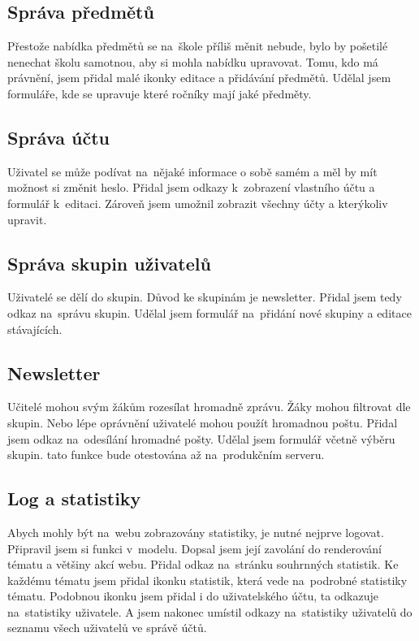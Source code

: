\documentclass[thesis=B,czech]{FITthesis}[2012/06/26]
\begin{document}
\subsection{Správa předmětů}

Přestože nabídka předmětů se na~škole příliš měnit nebude, bylo by pošetilé nenechat školu samotnou, aby si mohla nabídku upravovat. Tomu, kdo má právnění, jsem přidal malé ikonky editace a přidávání předmětů. Udělal jsem formuláře, kde se upravuje které ročníky mají jaké předměty.

\subsection{Správa účtu}

Uživatel se může podívat na~nějaké informace o sobě samém a měl by mít možnost si změnit heslo. Přidal jsem odkazy k~zobrazení vlastního účtu a formulář k~editaci. Zároveň jsem umožnil zobrazit všechny účty a kterýkoliv upravit.

\subsection{Správa skupin uživatelů}

Uživatelé se dělí do skupin. Důvod ke skupinám je newsletter. Přidal jsem tedy  odkaz na~správu skupin. Udělal jsem formulář na~přidání nové skupiny a editace stávajících.

\subsection{Newsletter}

Učitelé mohou svým žákům rozesílat hromadně zprávu. Žáky mohou filtrovat dle skupin. Nebo lépe oprávnění uživatelé mohou použít hromadnou poštu. Přidal jsem odkaz na~odesílání hromadné pošty. Udělal jsem formulář včetně výběru skupin. tato funkce bude otestována až na~produkčním serveru.

\subsection{Log a statistiky}

Abych mohly být na~webu zobrazovány statistiky, je nutné nejprve logovat. Připravil jsem si funkci v~modelu. Dopsal jsem její zavolání do renderování tématu a většiny akcí webu. Přidal odkaz na~stránku souhrnných statistik. Ke každému tématu jsem přidal ikonku statistik, která vede na~podrobné statistiky tématu. Podobnou ikonku jsem přidal i do uživatelského účtu, ta odkazuje na~statistiky uživatele. A jsem nakonec umístil odkazy na~statistiky uživatelů do seznamu všech uživatelů ve správě účtů.
\end{document}
